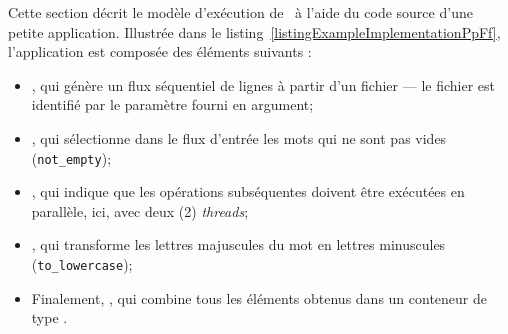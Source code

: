 Cette section d\'ecrit le mod\`ele d'ex\'ecution de \ppff\ \`a l'aide du code source d'une petite application. Illustr\'ee dans le listing~\ref{listingExampleImplementationPpFf}, l'application est compos\'ee des \'el\'ements suivants :
\begin{itemize}
	\item  {}, qui g\'en\`ere un flux s\'equentiel de lignes \`a partir d'un fichier --- le fichier est identifi\'e par le param\`etre  fourni en argument;



	\item  {}, qui s\'electionne dans le flux d'entr\'ee les mots qui ne sont pas vides (\texttt{not\_empty});

	\item {}, qui indique que les op\'erations subs\'equentes doivent \^etre ex\'ecut\'ees en parall\`ele, ici, avec deux (2) \emph{threads};
	
	\item {}, qui transforme les lettres majuscules du mot en lettres minuscules (\texttt{to\_lowercase});
	
	\item Finalement, , qui combine tous les \'el\'ements obtenus dans un conteneur de type .
\end{itemize}




